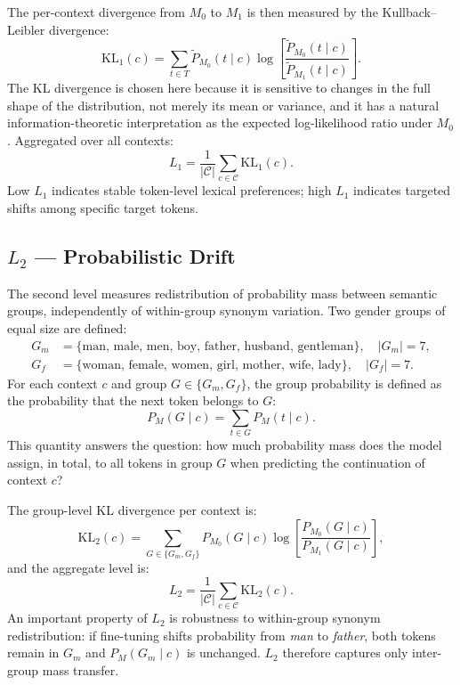 \documentclass[11pt,a4paper]{article}
\begin{document}
The per-context divergence from $M_0$ to $M_1$ is then measured by the
Kullback--Leibler divergence:
\[
  \mathrm{KL}_1(c)
  = \sum_{t \in T}
    \tilde{P}_{M_0}(t \mid c)
    \log\!\left[
      \frac{\tilde{P}_{M_0}(t \mid c)}{\tilde{P}_{M_1}(t \mid c)}
    \right].
\]
The KL divergence is chosen here because it is sensitive to changes in the full shape of the
distribution, not merely its mean or variance, and it has a natural information-theoretic
interpretation as the expected log-likelihood ratio under $M_0$. Aggregated over all contexts:
\[
  L_1 = \frac{1}{|\mathcal{C}|} \sum_{c \in \mathcal{C}} \mathrm{KL}_1(c).
\]
Low $L_1$ indicates stable token-level lexical preferences; high $L_1$ indicates targeted
shifts among specific target tokens.

\subsection{\texorpdfstring{$L_2$}{L2} --- Probabilistic Drift}
\label{sec:l2}

The second level measures redistribution of probability mass between semantic groups,
independently of within-group synonym variation. Two gender groups of equal size are defined:
\begin{align*}
  G_m &= \{\text{man, male, men, boy, father, husband, gentleman}\}, \quad |G_m| = 7,\\
  G_f &= \{\text{woman, female, women, girl, mother, wife, lady}\}, \quad |G_f| = 7.
\end{align*}
For each context $c$ and group $G \in \{G_m, G_f\}$, the group probability is defined as
the probability that the next token belongs to $G$:
\[
  P_M(G \mid c) = \sum_{t \in G} P_M(t \mid c).
\]
This quantity answers the question: how much probability mass does the model assign, in
total, to all tokens in group $G$ when predicting the continuation of context $c$?

The group-level KL divergence per context is:
\[
  \mathrm{KL}_2(c)
  = \sum_{G \in \{G_m, G_f\}}
    P_{M_0}(G \mid c)
    \log\!\left[
      \frac{P_{M_0}(G \mid c)}{P_{M_1}(G \mid c)}
    \right],
\]
and the aggregate level is:
\[
  L_2 = \frac{1}{|\mathcal{C}|} \sum_{c \in \mathcal{C}} \mathrm{KL}_2(c).
\]
An important property of $L_2$ is robustness to within-group synonym redistribution: if
fine-tuning shifts probability from \emph{man} to \emph{father}, both tokens remain in
$G_m$ and $P_M(G_m \mid c)$ is unchanged. $L_2$ therefore captures only inter-group mass
transfer.
\end{document}
